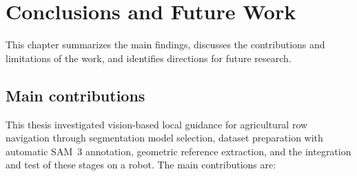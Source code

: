 \chapter{Conclusions and Future Work}
\label{cap:conclusions}

This chapter summarizes the main findings, discusses the contributions and limitations of the work, and identifies directions for future research.

\section{Main contributions}
\label{sec:contributions}

This thesis investigated vision-based local guidance for agricultural row navigation through segmentation model selection, dataset preparation with automatic SAM~3 annotation, geometric reference extraction, and the integration and test of these stages on a robot. The main contributions are:

